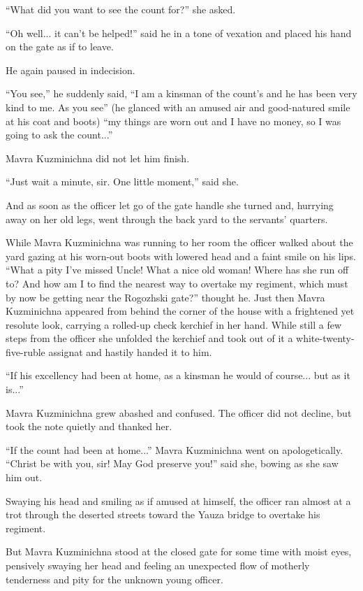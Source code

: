 ``What did you want to see the count for?'' she asked.

``Oh well... it can't be helped!'' said he in a tone of vexation
and placed his hand on the gate as if to leave.

He again paused in indecision.

``You see,'' he suddenly said, ``I am a kinsman of the count's
and he has been very kind to me. As you see'' (he glanced with an
amused air and good-natured smile at his coat and boots) ``my
things are worn out and I have no money, so I was going to ask
the count...''

Mavra Kuzminichna did not let him finish.

``Just wait a minute, sir. One little moment,'' said she.

And as soon as the officer let go of the gate handle she turned
and, hurrying away on her old legs, went through the back yard to
the servants' quarters.

While Mavra Kuzminichna was running to her room the officer
walked about the yard gazing at his worn-out boots with lowered
head and a faint smile on his lips. ``What a pity I've missed
Uncle! What a nice old woman! Where has she run off to? And how
am I to find the nearest way to overtake my regiment, which must
by now be getting near the Rogozhski gate?'' thought he. Just
then Mavra Kuzminichna appeared from behind the corner of the
house with a frightened yet resolute look, carrying a rolled-up
check kerchief in her hand. While still a few steps from the
officer she unfolded the kerchief and took out of it a
white-twenty-five-ruble assignat and hastily handed it to him.

``If his excellency had been at home, as a kinsman he would of
course...  but as it is...''

Mavra Kuzminichna grew abashed and confused. The officer did not
decline, but took the note quietly and thanked her.

``If the count had been at home...'' Mavra Kuzminichna went on
apologetically. ``Christ be with you, sir! May God preserve
you!'' said she, bowing as she saw him out.

Swaying his head and smiling as if amused at himself, the officer
ran almost at a trot through the deserted streets toward the
Yauza bridge to overtake his regiment.

But Mavra Kuzminichna stood at the closed gate for some time with
moist eyes, pensively swaying her head and feeling an unexpected
flow of motherly tenderness and pity for the unknown young
officer.

